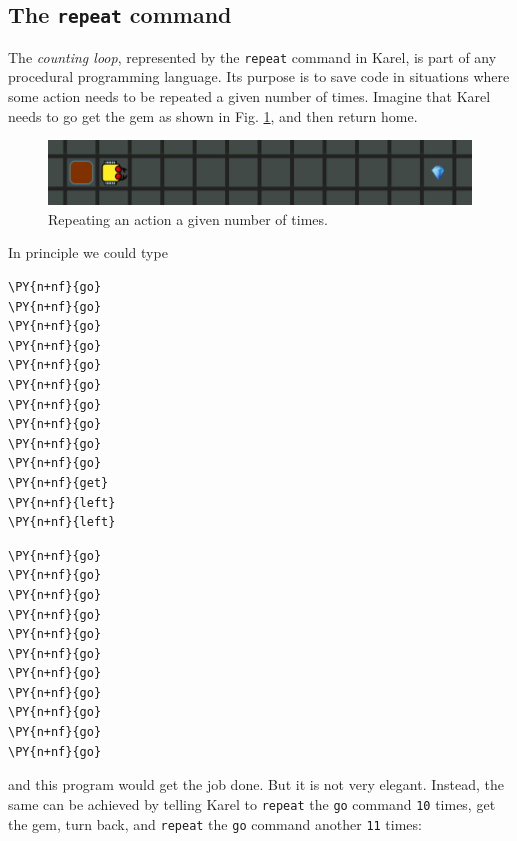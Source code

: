 \subsection{The {\tt repeat} command}

The {\em counting loop}, represented by the {\tt repeat} command in Karel,
is part of any procedural programming language. Its purpose is to save 
code in situations where some action needs to be repeated a given number 
of times. Imagine that Karel needs to go get the gem as shown in 
Fig. \ref{fig:counting-11}, and then return home. 

\begin{figure}[!ht]
\begin{center}
\includegraphics[width=12.2cm]{img/counting-11.png}
\vspace{-0mm}
\caption{Repeating an action a given number of times.}
\label{fig:counting-11}
\end{center}
\end{figure}

\noindent
In principle we could type\\

\begin{bbox}
\begin{Verbatim}[commandchars=\\\{\}]
\PY{n+nf}{go}
\PY{n+nf}{go}
\PY{n+nf}{go}
\PY{n+nf}{go}
\PY{n+nf}{go}
\PY{n+nf}{go}
\PY{n+nf}{go}
\PY{n+nf}{go}
\PY{n+nf}{go}
\PY{n+nf}{go}
\PY{n+nf}{get}
\PY{n+nf}{left}
\PY{n+nf}{left}
\end{Verbatim}
\end{bbox}
\vspace{6mm}


\begin{bbox}
\begin{Verbatim}[commandchars=\\\{\}]
\PY{n+nf}{go}
\PY{n+nf}{go}
\PY{n+nf}{go}
\PY{n+nf}{go}
\PY{n+nf}{go}
\PY{n+nf}{go}
\PY{n+nf}{go}
\PY{n+nf}{go}
\PY{n+nf}{go}
\PY{n+nf}{go}
\PY{n+nf}{go}
\end{Verbatim}
\end{bbox}
\vspace{6mm}

\noindent
and this program would get the job done. But it is not very elegant. 
Instead, the same can be achieved by telling Karel to {\tt repeat} the {\tt go} 
command {\tt 10} times, get the gem, turn back, and  {\tt repeat} the {\tt go} 
command another {\tt 11} times:\\

